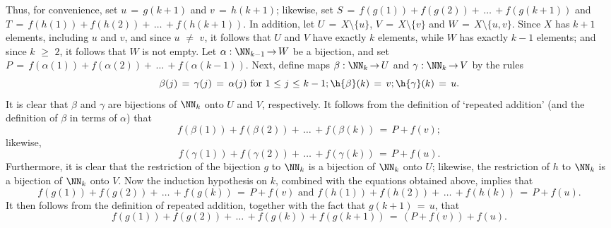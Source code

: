 {        Thus, for convenience, set $u \,=\, g(k+1)$ and $v \,=\, h(k+1)$; likewise, set $S \,=\, f(g(1)) + f(g(2)) + \,{\ldots}\,+f(g(k+1))$ and $T \,=\, f(h(1)) + f(h(2)) + \,{\ldots}\,+ f(h(k+1))$.
    In addition, let $U \,=\, X{\setminus}\{u\}$, $V \,=\, X{\setminus}\{v\}$ and $W \,=\, X{\setminus}\{u,v\}$.
    Since $X$ has $k+1$ elements, including $u$ and $v$, and since $u \,\,{\neq}\,\, v$,
    it follows that $U$ and $V$ have exactly $k$ elements, while $W$ has exactly $k-1$ elements; and since $k\,\,{\geq}\,\,2$, it follows that $W$ is not empty.
    Let ${\alpha}:{\NN}_{k-1} \,{\rightarrow}\, W$ be a bijection, and set $P \,=\, f({\alpha}(1)) + f({\alpha}(2)) + \,{\ldots}\, + f({\alpha}(k-1))$.
    Next, define maps ${\beta}:{\NN}_{k} \,{\rightarrow}\, U$ and ${\gamma}:{\NN}_{k} \,{\rightarrow}\, V$ by the rules
        \begin{displaymath}
        {\beta}(j) \,=\, {\gamma}(j) \,=\, {\alpha}(j) \mbox{ for $1\,\,{\leq}\,\,j\,\,{\leq}\,\,k-1$}; \h {\beta}(k) \,=\, v; \h {\gamma}(k) \,=\, u.
        \end{displaymath}
    It is clear that ${\beta}$ and ${\gamma}$ are bijections of ${\NN}_{k}$ onto $U$ and $V$, respectively.
    It follows from the definition of `repeated addition' (and the definition of ${\beta}$ in terms of ${\alpha}$) that
        \begin{displaymath}
        f({\beta}(1)) + f({\beta}(2)) + \,{\ldots}\, + f({\beta}(k)) \,=\, P + f(v);
        \end{displaymath}
    likewise,
        \begin{displaymath}
        f({\gamma}(1)) + f({\gamma}(2)) + \,{\ldots}\,+ f({\gamma}(k)) \,=\, P+ f(u).
        \end{displaymath}
    Furthermore, it is clear that the restriction of the bijection $g$ to ${\NN}_{k}$ is a bijection of ${\NN}_{k}$ onto $U$;
    likewise, the restriction of $h$ to ${\NN}_{k}$ is a bijection of ${\NN}_{k}$ onto $V$.
    Now the induction hypothesis on $k$, combined with the equations obtained above, implies that
        \begin{displaymath}
        f(g(1)) + f(g(2)) + \,{\ldots}\, + f(g(k)) \,=\, P + f(v) \mbox{ and }
    f(h(1)) + f(h(2)) + \,{\ldots}\, + f(h(k)) \,=\, P + f(u).
        \end{displaymath}
    It then follows from the definition of repeated addition, together with the fact that $g(k+1) \,=\, u$, that
        \begin{displaymath}
        f(g(1)) + f(g(2)) + \,{\ldots}\, + f(g(k)) + f(g(k+1)) \,=\, (P+f(v)) + f(u).

\end{displaymath}}
